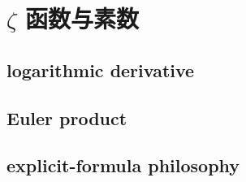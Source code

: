 \section{\texorpdfstring{\(\zeta\)}{ζ} 函数与素数}
\label{b3:sec:2702}


\subsection{logarithmic derivative}
\label{b3:subsec:270201}

\subsection{Euler product}
\label{b3:subsec:270202}

\subsection{explicit-formula philosophy}
\label{b3:subsec:270203}


